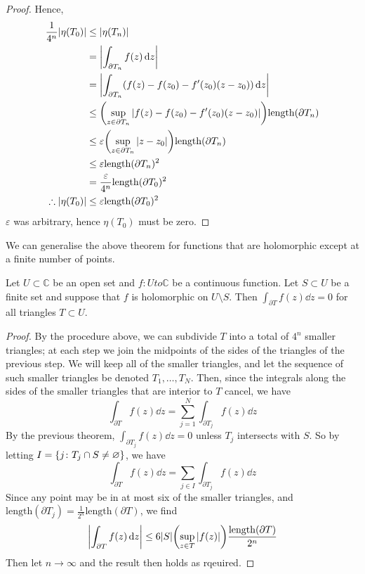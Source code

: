 \begin{proof}
	Hence,
	\begin{align*}
		\frac{1}{4^n} \abs{\eta(T_0)} &\leq \abs{\eta(T_n)} \\
		&= \abs{\int_{\partial T_n} f(z) \dd{z}} \\
		&= \abs{\int_{\partial T_n} (f(z) - f(z_0) - f'(z_0)(z - z_0)) \dd{z}} \\
		&\leq \qty(\sup_{z \in \partial T_n} \abs{f(z) - f(z_0) - f'(z_0)(z-z_0)}) \mathrm{length}(\partial T_n) \\
		&\leq \varepsilon \qty(\sup_{z \in \partial T_n} \abs{z - z_0}) \mathrm{length}(\partial T_n) \\
		&\leq \varepsilon \mathrm{length}(\partial T_n)^2 \\
		&= \frac{\varepsilon}{4^n} \mathrm{length}(\partial T_0)^2 \\
		\therefore \abs{\eta(T_0)} &\leq \varepsilon \mathrm{length}(\partial T_0)^2
	\end{align*}
	\( \varepsilon \) was arbitrary, hence \( \eta(T_0) \) must be zero.
\end{proof}
We can generalise the above theorem for functions that are holomorphic except at a finite number of points.
\begin{theorem}
	Let \( U \subset \mathbb C \) be an open set and \( f \colon U to \mathbb C \) be a continuous function.
	Let \( S \subset U \) be a finite set and suppose that \( f \) is holomorphic on \( U \setminus S \).
	Then \( \int_{\partial T} f(z) \dd{z} = 0 \) for all triangles \( T \subset U \).
\end{theorem}
\begin{proof}
	By the procedure above, we can subdivide \( T \) into a total of \( 4^n \) smaller triangles; at each step we join the midpoints of the sides of the triangles of the previous step.
	We will keep all of the smaller triangles, and let the sequence of such smaller triangles be denoted \( T_1, \dots, T_N \).
	Then, since the integrals along the sides of the smaller triangles that are interior to \( T \) cancel, we have
	\[ \int_{\partial T} f(z) \dd{z} = \sum_{j=1}^N \int_{\partial T_j} f(z) \dd{z} \]
	By the previous theorem, \( \int_{\partial T_j} f(z) \dd{z} = 0 \) unless \( T_j \) intersects with \( S \).
	So by letting \( I = \qty{j \colon T_j \cap S \neq \varnothing} \), we have
	\[ \int_{\partial T} f(z) \dd{z} = \sum_{j \in I} \int_{\partial T_j} f(z) \dd{z} \]
	Since any point may be in at most six of the smaller triangles, and \( \mathrm{length}(\partial T_j) = \frac{1}{2^n} \mathrm{length}(\partial T) \), we find
	\[ \abs{\int_{\partial T} f(z) \dd{z}} \leq 6\abs{S} \qty(\sup_{z \in T} \abs{f(z)}) \frac{\mathrm{length}(\partial T)}{2^n} \]
	Then let \( n \to \infty \) and the result then holds as rqeuired.
\end{proof}
